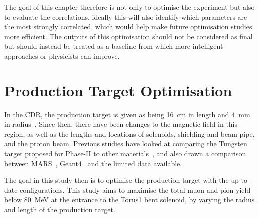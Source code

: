 The goal of this chapter therefore is not only to optimise the experiment but also to evaluate the correlations.
ideally this will also identify which parameters are the most strongly correlated, which would help make future optimisation studies more efficient.
The outputs of this optimisation should not be considered as final but should instead be treated as a baseline from which more intelligent approaches or physicists can improve.


\section{Production Target Optimisation}
In the \phaseII \ac{CDR}, the production target is given as being 16~cm in
length and 4~mm in radius~\cite{CDR}.  Since then, there have been changes to
the magnetic field in this region, as well as the lengths and locations of
solenoids, shielding and beam-pipe, and the proton beam.  Previous studies have
looked at comparing the Tungsten target proposed for Phase-II to other
materials~\cite{thesis-AEdmonds}, and also drawn a comparison between
MARS~\cite{MARS}, Geant4~\cite{Geant4} and the limited data available.

The goal in this study then is to optimise the production target with the
up-to-date configurations.  This study aims to maximise the total muon and pion
yield below 80~MeV at the entrance to the Torus1 bent solenoid, by varying the
radius and length of the production target.


